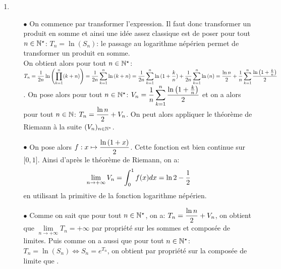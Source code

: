 \documentclass[a4paper, 11pt,reqno]{article}
\begin{document}
\begin{correction}
\begin{enumerate}
\begin{itemize}
			            $$\lim\limits_{n\to +\infty} t_n=\int_0^1 f(x)dx=2\ln{2}-1.$$
			      \item[$\bullet$] Comme on sait que pour tout $n\in\N^{\star}$, on a: $t_n=\ln{(w_n)}\Leftrightarrow w_n=e^{t_n}$, on obtient par propri\'et\'e sur la composition de limite que: .
		      \end{itemize}
		\item
		      \begin{itemize}
			      \item[$\bullet$] On commence par transformer l'expression. Il faut donc transformer un produit en somme et ainsi une id\'ee assez classique est de poser pour tout $n\in\N^{\star}$: $T_n=\ln{(S_n)}$: le passage au logarithme n\'ep\'erien permet de transformer un produit en somme.\\
			            \noindent On obtient alors pour tout $n\in\N^{\star}$: $T_n=\displaystyle\frac{1}{2n} \ln{\left( \prod_{k=1}^{n} (k+n) \right)}=\displaystyle\frac{1}{2n}  \displaystyle\sum\limits_{k=1}^{n} \ln{(k+n)}=\displaystyle\frac{1}{2n}  \displaystyle\sum\limits_{k=1}^{n} \ln{(1+\frac{k}{n})}+\displaystyle\frac{1}{2n}  \displaystyle\sum\limits_{k=1}^{n} \ln{(n)}=\displaystyle\frac{\ln{n}}{2}+\displaystyle\frac{1}{n}  \displaystyle\sum\limits_{k=1}^{n} \displaystyle\frac{\ln{\left(1+\frac{k}{n}\right)}}{2}$. On pose alors pour tout $n\in\N^{\star}$: $V_n=\displaystyle\frac{1}{n}  \displaystyle\sum\limits_{k=1}^{n} \displaystyle\frac{\ln{\left(1+\frac{k}{n}\right)}}{2}$ et on a alors pour tout $n\in\mathbb{N}$: $T_n=\displaystyle\frac{\ln{n}}{2}+V_n$. On peut alors appliquer le th\'eor\`{e}me de Riemann \`{a} la suite $(V_n)_{n\in\mathbb{N}^{\star}}$.
			      \item[$\bullet$] On pose alors $f: x\mapsto \displaystyle\frac{\ln{\left(  1+x\right)}}{2}$. Cette fonction est bien continue sur $\lbrack 0,1\rbrack$. Ainsi d'apr\`{e}s le th\'eor\`{e}me de Riemann, on a:
			            $$\lim\limits_{n\to +\infty} V_n=\int_0^1 f(x)dx=\ln{2}-\displaystyle\frac{1}{2}$$
			            en utilisant la primitive de la fonction logarithme n\'ep\'erien.
			      \item[$\bullet$] Comme on sait que pour tout $n\in\N^{\star}$, on a: $T_n=\displaystyle\frac{\ln{n}}{2}+V_n$, on obtient que $\lim\limits_{n\to +\infty} T_n=+\infty$ par propri\'et\'e sur les sommes et compos\'ee de limites. Puis comme on a aussi que pour tout $n\in\N^{\star}$: $T_n=\ln{(S_n)}\Leftrightarrow S_n=e^{T_n}$, on obtient par propri\'et\'e sur la compos\'ee de limite que .
		      \end{itemize}
	\end{enumerate}
\end{correction}
\end{document}
